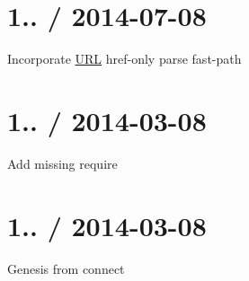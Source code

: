 \section*{1.. / 2014-\/07-\/08 }


\begin{DoxyItemize}
\item Incorporate \hyperlink{struct_u_r_l}{U\+R\+L} href-\/only parse fast-\/path
\end{DoxyItemize}

\section*{1.. / 2014-\/03-\/08 }


\begin{DoxyItemize}
\item Add missing {\ttfamily require}
\end{DoxyItemize}

\section*{1.. / 2014-\/03-\/08 }


\begin{DoxyItemize}
\item Genesis from {\ttfamily connect} 
\end{DoxyItemize}